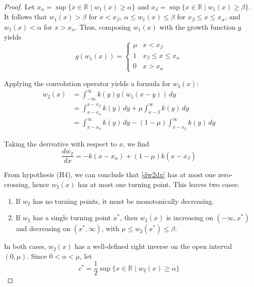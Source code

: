 \documentclass[11pt]{article}
\theoremstyle{definition}
\numberwithin{equation}{section}
\numberwithin{thm}{section}
\renewcommand{\a}{\alpha}
\renewcommand{\b}{\beta}
\newcommand{\m}{\mu}
\begin{document}
\begin{proof} Let $x_\a=\sup\{x\in\mathbb R\mid w_1(x)\geq\a\}$ and $x_\b=\sup\{x\in\mathbb R\mid w_1(x)\geq\b\}$. It follows that $w_1(x)>\b$ for $x<x_\b$, $\a\leq w_1(x)\leq\b$ for $x_\b\leq x\leq x_\a$, and $w_1(x)<\a$ for $x>x_\a$. Thus, composing $w_1(x)$ with the growth function $g$ yields
\begin{equation} \label{gw1}
g(w_1(x)) = \begin{cases}
\mu & x < x_\beta \\
1 & x_\beta \leq x \leq x_\a \\
0 & x > x_\a
\end{cases} \end{equation}

Applying the convolution operator yields a formula for $w_2(x)$:
\begin{equation} \label{w2calculation}
\begin{aligned}
w_2(x) &= \int_{-\infty}^{\infty} k(y) g(w_1(x-y)) \, dy \\
&= \int_{x-x_\a}^{x-x_\b} k(y)\,dy + \m \int_{x-\beta}^{\infty} k(y)\,dy \\
&= \int_{x-x_\a}^{\infty} k(y)\,dy - (1-\m) \int_{x-x_\b}^{\infty} k(y)\,dy
\end{aligned}
\end{equation}

Taking the derivative with respect to $x$, we find
\begin{equation}\label{dw2dx}
\frac{dw_2}{dx} = -k(x-x_\a) + (1-\m)k(x-x_\b)
\end{equation}

From hypothesis (H4), we can conclude that \eqref{dw2dx} has at most one zero-crossing, hence $w_2(x)$ has at most one turning point. This leaves two cases:
\begin{enumerate}[{Case} 1.]
\item If $w_2$ has no turning points, it must be monotonically decreasing.
\item If $w_2$ has a single turning point $x^*$, then $w_2(x)$ is increasing on $(-\infty,x^*)$ and decreasing on $(x^*,\infty)$, with $\m \leq w_2(x^*)\leq \b$.
\end{enumerate}

In both cases, $w_2(x)$ has a well-defined right inverse on the open interval $(0,\m)$. Since $0<\a<\m$, let
\begin{equation}
c^*=\frac{1}{2}\sup\{x\in\mathbb R\mid w_2(x)\geq\a\}
\end{equation}


\end{proof}
\end{document}
